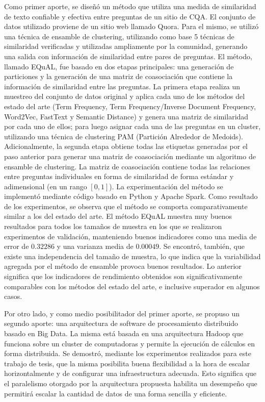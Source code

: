 \bigskip Como primer aporte, se diseñó un método que utiliza una medida de similaridad de texto confiable y efectiva entre preguntas de un sitio de CQA. El conjunto de datos utilizado proviene de un sitio web llamado Quora. Para el mismo, se utilizó una técnica de ensamble de clustering, utilizando como base 5 técnicas de similaridad verificadas y utilizadas ampliamente por la comunidad, generando una salida con información de similaridad entre pares de preguntas. El método, llamado EQuAL, fue basado en dos etapas principales: una generación de particiones y la generación de una matriz de coasociación que contiene la información de similaridad entre las preguntas. La primera etapa realiza un muestreo del conjunto de datos original y aplica cada uno de los métodos del estado del arte (Term Frequency, Term Frequency/Inverse Document Frequency, Word2Vec, FastText y Semantic Distance) y genera una matriz de similaridad por cada uno de ellos; para luego asignar cada una de las preguntas en un cluster, utilizando una técnica de clustering PAM (Partición Alrededor de Medoids). Adicionalmente, la segunda etapa obtiene todas las etiquetas generadas por el paso anterior para generar una matriz de coasociación mediante un algoritmo de ensamble de clustering. La matriz de coasociación contiene todas las relaciones entre preguntas individuales en forma de similaridad de forma estándar y adimensional (en un rango \([0,1]\)). La experimentación del método se implementó mediante código basado en Python y Apache Spark. Como resultado de los experimentos, se observa que el método se comporta comparativamente similar a los del estado del arte. El método EQuAL muestra muy buenos resultados para todos los tamaños de muestra en los que se realizaron experimentos de validación,  manteniendo buenos indicadores como una media de error de \(0.32286\) y una varianza media de \(0.00049\). Se encontró, también, que existe una independencia del tamaño de muestra, lo que indica que la variabilidad agregada por el método de ensamble provoca buenos resultados. Lo anterior significa que los indicadores de rendimiento obtenidos son significativamente comparables con los métodos del estado del arte, e inclusive superador en algunos casos.

\bigskip Por otro lado, y como medio posibilitador del primer aporte, se propuso un segundo aporte: una arquitectura de software de procesamiento distribuido basado en Big Data. La misma está basada en una arquitectura Hadoop que funciona sobre un cluster de computadoras y permite la ejecución de cálculos en forma distribuida. Se demostró, mediante los experimentos realizados para este trabajo de tesis, que la misma posibilita buena flexibilidad a la hora de escalar horizontalmente y de configurar una infraestructura adecuada. Esto significa que el paralelismo otorgado por la arquitectura propuesta habilita un desempeño que permitirá escalar la cantidad de datos de una forma sencilla y eficiente.

